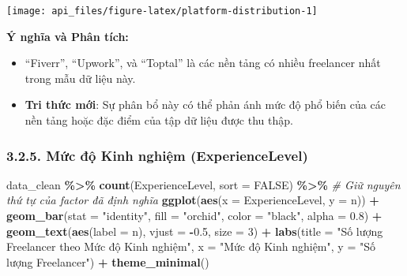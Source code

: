 \documentclass[
]{article}
\newenvironment{Shaded}{\begin{snugshade}}{\end{snugshade}}
\newcommand{\AttributeTok}[1]{\textcolor[rgb]{0.13,0.29,0.53}{#1}}
\newcommand{\CommentTok}[1]{\textcolor[rgb]{0.56,0.35,0.01}{\textit{#1}}}
\newcommand{\ConstantTok}[1]{\textcolor[rgb]{0.56,0.35,0.01}{#1}}
\newcommand{\DecValTok}[1]{\textcolor[rgb]{0.00,0.00,0.81}{#1}}
\newcommand{\FloatTok}[1]{\textcolor[rgb]{0.00,0.00,0.81}{#1}}
\newcommand{\FunctionTok}[1]{\textcolor[rgb]{0.13,0.29,0.53}{\textbf{#1}}}
\newcommand{\NormalTok}[1]{#1}
\newcommand{\SpecialCharTok}[1]{\textcolor[rgb]{0.81,0.36,0.00}{\textbf{#1}}}
\newcommand{\StringTok}[1]{\textcolor[rgb]{0.31,0.60,0.02}{#1}}
\begin{document}
\begin{center}\texttt{[image: api\_files/figure-latex/platform-distribution-1]} \end{center}

\textbf{Ý nghĩa và Phân tích:}

\begin{itemize}
\item
  ``Fiverr'', ``Upwork'', và ``Toptal'' là các nền tảng có nhiều
  freelancer nhất trong mẫu dữ liệu này.
\item
  \textbf{Tri thức mới}: Sự phân bổ này có thể phản ánh mức độ phổ biến
  của các nền tảng hoặc đặc điểm của tập dữ liệu được thu thập.
\end{itemize}

\subsubsection{3.2.5. Mức độ Kinh nghiệm
(ExperienceLevel)}\label{mux1ee9c-ux111ux1ed9-kinh-nghiux1ec7m-experiencelevel}

\begin{Shaded}
\begin{Highlighting}[]
\NormalTok{data\_clean }\SpecialCharTok{\%\textgreater{}\%}
  \FunctionTok{count}\NormalTok{(ExperienceLevel, }\AttributeTok{sort =} \ConstantTok{FALSE}\NormalTok{) }\SpecialCharTok{\%\textgreater{}\%} \CommentTok{\# Giữ nguyên thứ tự của factor đã định nghĩa}
  \FunctionTok{ggplot}\NormalTok{(}\FunctionTok{aes}\NormalTok{(}\AttributeTok{x =}\NormalTok{ ExperienceLevel, }\AttributeTok{y =}\NormalTok{ n)) }\SpecialCharTok{+} 
  \FunctionTok{geom\_bar}\NormalTok{(}\AttributeTok{stat =} \StringTok{"identity"}\NormalTok{, }\AttributeTok{fill =} \StringTok{"orchid"}\NormalTok{, }\AttributeTok{color =} \StringTok{"black"}\NormalTok{, }\AttributeTok{alpha =} \FloatTok{0.8}\NormalTok{) }\SpecialCharTok{+}
  \FunctionTok{geom\_text}\NormalTok{(}\FunctionTok{aes}\NormalTok{(}\AttributeTok{label =}\NormalTok{ n), }\AttributeTok{vjust =} \SpecialCharTok{{-}}\FloatTok{0.5}\NormalTok{, }\AttributeTok{size =} \DecValTok{3}\NormalTok{) }\SpecialCharTok{+}
  \FunctionTok{labs}\NormalTok{(}\AttributeTok{title =} \StringTok{"Số lượng Freelancer theo Mức độ Kinh nghiệm"}\NormalTok{,}
       \AttributeTok{x =} \StringTok{"Mức độ Kinh nghiệm"}\NormalTok{,}
       \AttributeTok{y =} \StringTok{"Số lượng Freelancer"}\NormalTok{) }\SpecialCharTok{+}
  \FunctionTok{theme\_minimal}\NormalTok{()}
\end{Highlighting}
\end{Shaded}
\end{document}

